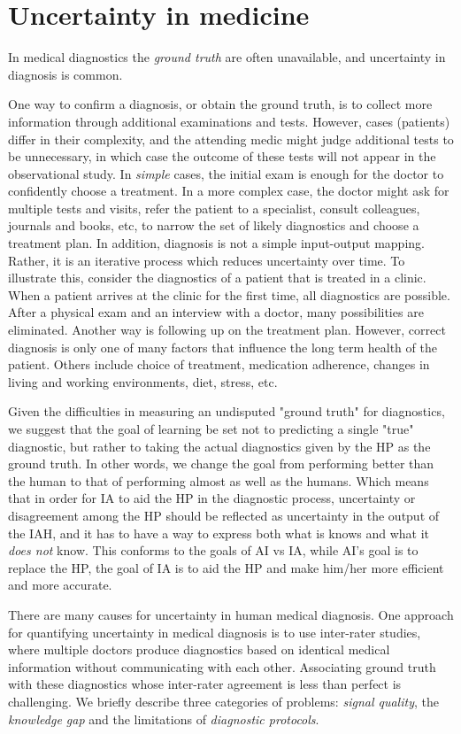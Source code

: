 \documentclass[11pt]{pnas-new}
\begin{document}
\section{Uncertainty in medicine}

In medical diagnostics the {\em ground truth} are often unavailable, and uncertainty in diagnosis is common. 

{\color{blue}One way to confirm a diagnosis, or obtain the ground truth, is to collect more information through additional examinations and tests. However, cases (patients) differ in their complexity, and the attending medic might judge additional tests to be unnecessary, in which case the outcome of these tests will not appear in the observational study. 
In {\em simple} cases, the initial exam is enough for the doctor to confidently choose a treatment. In a more complex case, the doctor might ask for multiple tests and visits, refer the patient to a specialist, consult colleagues, journals and books, etc, to narrow the set of likely diagnostics and choose a treatment plan. 
%
In addition, diagnosis is not a simple input-output mapping. Rather, it is an iterative process which reduces uncertainty over time. To illustrate this, consider the diagnostics of a patient that is treated in a clinic.  When a patient arrives at the clinic for the first time, all diagnostics are possible. After a physical exam and an interview with a doctor, many possibilities are eliminated.
%
Another way is following up on the treatment plan. However, correct diagnosis is only one of many factors that influence the long term health of the patient. Others include choice of treatment, medication adherence, changes in living and working environments, diet, stress, etc.





Given the difficulties in measuring an undisputed "ground truth" for diagnostics, we suggest that the goal of learning be set not to predicting a {single} "true" diagnostic, but rather to {taking} the actual diagnostics given by the HP as the ground truth. In other words, we change the goal from performing better than the human to that of performing almost as well as the humans. Which means that in order for IA to aid the HP in the diagnostic process, uncertainty or disagreement among the HP should be reflected as uncertainty in the output of the IAH, and 
 it has to have a way to express both what is knows and what it {\em does not} know.
%
This conforms to the goals of AI vs IA, while AI's goal is to replace the HP, the goal of IA is to aid the HP and make him/her more efficient and more accurate.



There are many causes for uncertainty in human medical diagnosis. One approach for quantifying uncertainty in medical diagnosis is to use inter-rater studies, {where} multiple doctors produce diagnostics based on identical medical information without communicating with each other. Associating ground truth with these diagnostics whose inter-rater agreement is less than perfect is challenging.
We briefly describe three categories of problems: {\em signal quality}, the {\em knowledge gap} and the limitations of {\em diagnostic protocols}.}
\end{document}
